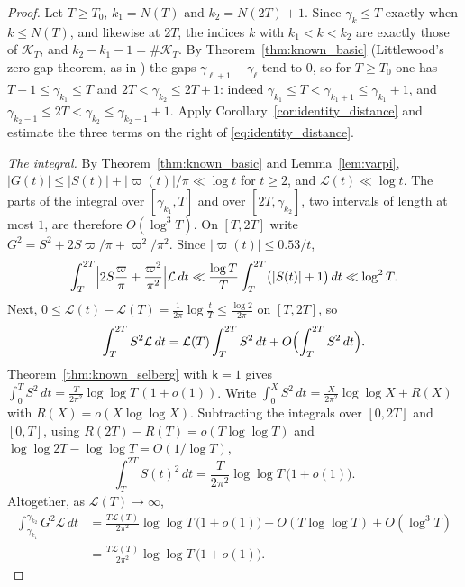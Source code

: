 \documentclass[11pt,a4paper]{article}
\makeatletter
\numberwithin{equation}{section}
\DeclareRobustCommand{\CGref}[1]{\ref{#1}}
\DeclareRobustCommand{\CGeqref}[1]{\eqref{#1}}
\DeclareRobustCommand{\CGcite}[2][]{\if\relax\detokenize{#1}\relax\cite{#2}\else\cite[#1]{#2}\fi}
\let\CG@origref\ref
\let\CG@origeqref\eqref
\newcommand{\CG@gettip}[1]{\@ifundefined{CGTip@#1}{#1}{\csname CGTip@#1\endcsname}}
\newcommand{\CG@getbib}[1]{\@ifundefined{CGBib@#1}{#1}{\csname CGBib@#1\endcsname}}
\DeclareRobustCommand{\CGref}[1]{\pdftooltip{\CG@origref{#1}}{\CG@gettip{#1}}}
\DeclareRobustCommand{\CGeqref}[1]{\pdftooltip{\CG@origeqref{#1}}{\CG@gettip{#1}}}
\DeclareRobustCommand{\CGcite}[2][]{\pdftooltip{\if\relax\detokenize{#1}\relax\cite{#2}\else\cite[#1]{#2}\fi}{\CG@getbib{#2}}}
\theoremstyle{definition}
\theoremstyle{remark}
\newcommand{\lL}{\mathcal L}
\newcommand{\Kc}{\mathcal K}
\makeatother
\begin{document}
\begin{proof}
Let $T\ge T_0$, $k_1=N(T)$ and $k_2=N(2T)+1$. Since $\gamma_k\le T$ exactly when $k\le N(T)$, and likewise at $2T$, the indices $k$ with $k_1<k<k_2$ are exactly those of $\Kc_T$, and $k_2-k_1-1=\#\Kc_T$. By Theorem~\CGref{thm:known_basic} (Littlewood's zero-gap theorem, as in \CGcite[Thm.~9.12]{Titchmarsh1986}) the gaps $\gamma_{\ell+1}-\gamma_\ell$ tend to $0$, so for $T\ge T_0$ one has $T-1\le\gamma_{k_1}\le T$ and $2T<\gamma_{k_2}\le2T+1$: indeed $\gamma_{k_1}\le T<\gamma_{k_1+1}\le\gamma_{k_1}+1$, and $\gamma_{k_2-1}\le2T<\gamma_{k_2}\le\gamma_{k_2-1}+1$. Apply Corollary~\CGref{cor:identity_distance} and estimate the three terms on the right of \CGeqref{eq:identity_distance}.

\emph{The integral.} By Theorem~\CGref{thm:known_basic} and Lemma~\CGref{lem:varpi}, $|G(t)|\le|S(t)|+|\varpi(t)|/\pi\ll\log t$ for $t\ge2$, and $\lL(t)\ll\log t$. The parts of the integral over $[\gamma_{k_1},T]$ and over $[2T,\gamma_{k_2}]$, two intervals of length at most $1$, are therefore $O(\log^3T)$. On $[T,2T]$ write $G^2=S^2+2S\varpi/\pi+\varpi^2/\pi^2$. Since $|\varpi(t)|\le0.53/t$,
\begin{equation}
\int_T^{2T}\Bigl|2S\frac\varpi\pi+\frac{\varpi^2}{\pi^2}\Bigr|\lL\,dt\ll\frac{\log T}{T}\int_T^{2T}\bigl(|S(t)|+1\bigr)\,dt\ll\log^2T .
\label{eq:disp_30}
\end{equation}
Next, $0\le\lL(t)-\lL(T)=\frac1{2\pi}\log\frac tT\le\frac{\log2}{2\pi}$ on $[T,2T]$, so
\begin{equation}
\int_T^{2T}S^2\lL\,dt=\lL(T)\int_T^{2T}S^2\,dt+O\Bigl(\int_T^{2T}S^2\,dt\Bigr).
\label{eq:disp_31}
\end{equation}
Theorem~\CGref{thm:known_selberg} with $\mathsf k=1$ gives $\int_0^TS^2\,dt=\frac{T}{2\pi^2}\log\log T\,(1+o(1))$. Write $\int_0^XS^2\,dt=\frac{X}{2\pi^2}\log\log X+R(X)$ with $R(X)=o(X\log\log X)$. Subtracting the integrals over $[0,2T]$ and $[0,T]$, using $R(2T)-R(T)=o(T\log\log T)$ and $\log\log2T-\log\log T=O(1/\log T)$,
\begin{equation}
\int_T^{2T}S(t)^2\,dt=\frac{T}{2\pi^2}\log\log T\,\bigl(1+o(1)\bigr).
\label{eq:selberg_dyadic}
\end{equation}
Altogether, as $\lL(T)\to\infty$,
\begin{equation}
\begin{aligned}
\int_{\gamma_{k_1}}^{\gamma_{k_2}}G^2\lL\,dt&=\frac{T\lL(T)}{2\pi^2}\log\log T\,\bigl(1+o(1)\bigr)+O(T\log\log T)+O(\log^3T)\\
&=\frac{T\lL(T)}{2\pi^2}\log\log T\,\bigl(1+o(1)\bigr).
\end{aligned}
\label{eq:disp_32}
\end{equation}


\end{proof}
\end{document}
